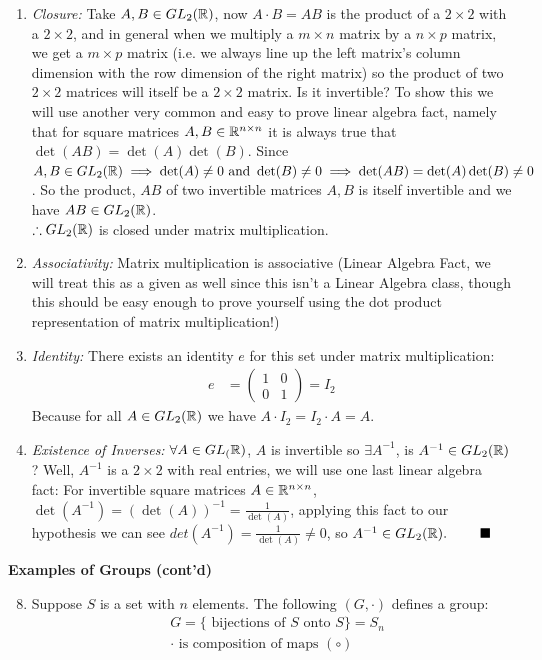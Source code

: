 \begin{enumerate}[label=(\roman*)]
    \item \textit{Closure:} Take $A,B\in GL_2({\mathbb{R}})$, now $A\cdot B=AB$ is the product of a
    $2\times 2$ with a $2\times 2$, and in general when we multiply a $m\times n$ matrix by a
    $n\times p$ matrix, we get a $m\times p$ matrix (i.e. we always line up the left matrix's column
    dimension with the row dimension of the right matrix) so the product of two $2\times 2$ matrices
    will itself be a $2\times 2$ matrix. Is it invertible? To show this we will use another very
    common and easy to prove linear algebra fact, namely that for square matrices
    $A,B \in {\mathbb{R}}^{n\times n}$ it is always true that $\det(AB)=\det(A)\det(B)$. Since
    $A,B\in GL_2({\mathbb{R}}) \implies \det(A)\neq 0 \text{ and } \det(B)\neq 0 \implies \det(AB)=\det(A)\det(B)\neq 0$.
    So the product, $AB$ of two invertible matrices $A,B$ is itself invertible and we have
    $AB\in GL_2({\mathbb{R}})$. \\ $\therefore GL_2({\mathbb{R}})$ is closed under matrix multiplication.
    \item \textit{Associativity: } Matrix multiplication is associative (Linear Algebra Fact, we
    will treat this as a given as well since this isn't a Linear Algebra class, though this should
    be easy enough to prove yourself using the dot product representation of matrix multiplication!)
    \item \textit{Identity: }There exists an identity $e$ for this set under matrix multiplication:
    \begin{align}
        e&=\left(\begin{matrix}
1 & 0 \\
0 & 1
\end{matrix}\right) = I_2\nonumber
    \end{align}
    Because for all $A\in GL_2({\mathbb{R}})$ we have $A\cdot I_2=I_2\cdot A = A$.
    \item \textit{Existence of Inverses: }$\forall A \in GL_({\mathbb{R}})$, $A$ is invertible so
    $\exists A^{-1}$, is $A^{-1}\in GL_2({\mathbb{R}})$? Well, $A^{-1}$ is a $2\times 2$ with real entries, we
    will use one last linear algebra fact: For invertible square matrices $A\in {\mathbb{R}}^{n\times n}$,
    $\det(A^{-1})=(\det(A))^{-1}=\frac{1}{\det(A)}$, applying this fact to our hypothesis we can see
    $det(A^{-1})=\frac{1}{\det(A)}\neq 0$, so $A^{-1}\in GL_2(\R). \ \ \ \ \ \ \ \blacksquare$
\end{enumerate}\steezybreak
\noindent\textbf{Examples of Groups (cont'd)}
\noindent\begin{enumerate}
\setcounter{enumi}{7}
    \item Suppose $S$ is a set with $n$ elements. The following $(G,\cdot)$ defines a group:
    \begin{align}
        &G= \{\text{ bijections of } S \text{ onto } S\} = S_n \nonumber \\
        &\cdot \text{ is composition of maps } (\circ) \nonumber
    \end{align}
\end{enumerate}
